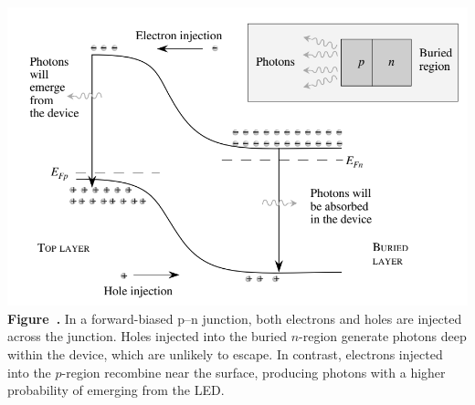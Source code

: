 \begin{center}
	\begin{minipage}{0.90\textwidth}
		\centering
		\includegraphics[width=\textwidth]{img/LED.png}
		\\[0.5em]
		\textbf{Figure~\thefigure.} In a forward-biased p–n junction, both electrons and holes are injected across the junction. Holes injected into the buried $n$-region generate photons deep within the device, which are unlikely to escape. In contrast, electrons injected into the $p$-region recombine near the surface, producing photons with a higher probability of emerging from the LED.
		\label{fig:LED}
	\end{minipage}
\end{center}


